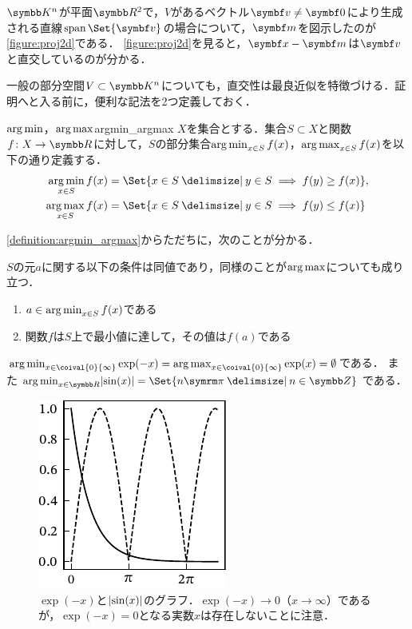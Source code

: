 \documentclass[../../main]{subfiles}
\begin{document}
\(\numset{K}^n\)が平面\(\numset{R}^2\)で，\(V\)があるベクトル\(\vect{v}\neq\zvec\)により生成される直線\(\spannedby\Set{\vect{v}}\)の場合について，\(\vect{m}\)を図示したのが\cref{figure:proj2d}である．
\cref{figure:proj2d}を見ると，\(\vect{x}-\vect{m}\)は\(\vect{v}\)と直交しているのが分かる．

一般の部分空間\(V\subset\numset{K}^n\)についても，直交性は最良近似を特徴づける．証明へと入る前に，便利な記法を2つ定義しておく．

\begin{definition}{\(\argmin\)，\(\argmax\)}{argmin_argmax}\index{\(\argmin\)}\index{\(\argmax\)}
  \(X\)を集合とする．集合\(S\subset X\)と関数\(f\colon X\to\numset{R}\)に対して，\(S\)の部分集合\(\operatorname*{arg\,min}_{x\in S}f(x)\)，\(\operatorname*{arg\,max}_{x\in S}f(x)\)を以下の通り定義する．
  \begin{align*}
    \argmin_{x\in S}f(x) &= \Set{x\in S\given y\in S\implies f(y)\geq f(x)}, \\
    \argmax_{x\in S}f(x) &= \Set{x\in S\given y\in S\implies f(y)\leq f(x)}
  \end{align*}
\end{definition}

\cref{definition:argmin_argmax}からただちに，次のことが分かる．

\begin{proposition}{}{}
  \(S\)の元\(a\)に関する以下の条件は同値であり，同様のことが\(\argmax\)についても成り立つ．
  \begin{enumerate}
    \item \(a\in\operatorname*{arg\,min}_{x\in S}f(x)\)である
    \item 関数\(f\)は\(S\)上で最小値に達して，その値は\(f(a)\)である
  \end{enumerate}
\end{proposition}

\begin{example}
  \(\argmin_{x\in\coival{0}{\infty}}\exp(-x)=\argmax_{x\in\coival{0}{\infty}}\exp(x)=\emptyset\)である．
  また\(\argmin_{x\in\numset{R}}\abs{\sin(x)}=\Set{n\krez\given n\in\numset{Z}}\)である．
\end{example}

\begin{figure}[htbp]
  \centering
  \includegraphics{argmin.pdf}
  \caption{\(\exp(-x)\)と\(\lvert\sin(x)\rvert\)のグラフ．\(\exp(-x)\to 0\)（\(x\to\infty\)）であるが，\(\exp(-x)=0\)となる実数\(x\)は存在しないことに注意．}
\end{figure}
\end{document}
